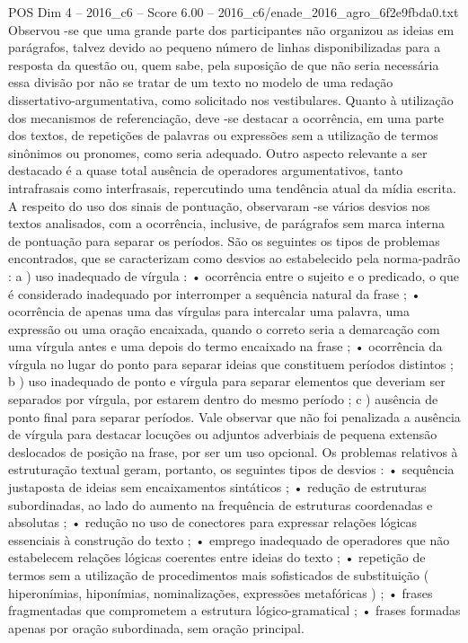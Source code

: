 \begin{textsample}{POS Dim 4 – 2016\_c6 – Score 6.00 – 2016\_c6/enade\_2016\_agro\_6f2e9fbda0.txt}
Observou -se que uma grande parte dos participantes não organizou as ideias em parágrafos, talvez devido ao pequeno número de linhas disponibilizadas para a resposta da questão ou, quem sabe, pela suposição de que não seria necessária essa divisão por não se tratar de um texto no modelo de uma redação dissertativo-argumentativa, como solicitado nos vestibulares.
Quanto à utilização dos mecanismos de referenciação, deve -se destacar a ocorrência, em uma parte dos textos, de repetições de palavras ou expressões sem a utilização de termos sinônimos ou pronomes, como seria adequado.
Outro aspecto relevante a ser destacado é a quase total ausência de operadores argumentativos, tanto intrafrasais como interfrasais, repercutindo uma tendência atual da mídia escrita.
A respeito do uso dos sinais de pontuação, observaram -se vários desvios nos textos analisados, com a ocorrência, inclusive, de parágrafos sem marca interna de pontuação para separar os períodos.
São os seguintes os tipos de problemas encontrados, que se caracterizam como desvios ao estabelecido pela norma-padrão : a ) uso inadequado de vírgula : • ocorrência entre o sujeito e o predicado, o que é considerado inadequado por interromper a sequência natural da frase ; • ocorrência de apenas uma das vírgulas para intercalar uma palavra, uma expressão ou uma oração encaixada, quando o correto seria a demarcação com uma vírgula antes e uma depois do termo encaixado na frase ; • ocorrência da vírgula no lugar do ponto para separar ideias que constituem períodos distintos ; b ) uso inadequado de ponto e vírgula para separar elementos que deveriam ser separados por vírgula, por estarem dentro do mesmo período ; c ) ausência de ponto final para separar períodos.
Vale observar que não foi penalizada a ausência de vírgula para destacar locuções ou adjuntos adverbiais de pequena extensão deslocados de posição na frase, por ser um uso opcional.
Os problemas relativos à estruturação textual geram, portanto, os seguintes tipos de desvios : • sequência justaposta de ideias sem encaixamentos sintáticos ; • redução de estruturas subordinadas, ao lado do aumento na frequência de estruturas coordenadas e absolutas ; • redução no uso de conectores para expressar relações lógicas essenciais à construção do texto ; • emprego inadequado de operadores que não estabelecem relações lógicas coerentes entre ideias do texto ; • repetição de termos sem a utilização de procedimentos mais sofisticados de substituição ( hiperonímias, hiponímias, nominalizações, expressões metafóricas ) ; • frases fragmentadas que comprometem a estrutura lógico-gramatical ; • frases formadas apenas por oração subordinada, sem oração principal.

\end{textsample}
